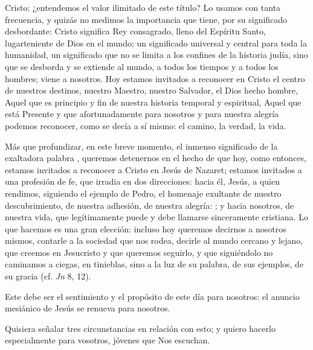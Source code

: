 \begin{body}
Cristo: ¿entendemos el valor ilimitado de este título? Lo usamos con tanta frecuencia, y quizás no medimos la importancia que tiene, por su significado desbordante: Cristo significa Rey consagrado, lleno del Espíritu Santo, lugarteniente de Dios en el mundo; un significado universal y central para toda la humanidad, un significado que no se limita a los confines de la historia judía, sino que se desborda y se extiende al mundo, a todos los tiempos y a todos los hombres; viene a nosotros. Hoy estamos invitados a reconocer en Cristo el centro de nuestros destinos, nuestro Maestro, nuestro Salvador, el Dios hecho hombre, Aquel que es principio y fin de nuestra historia temporal y espiritual, Aquel que está Presente y que afortunadamente para nosotros y para nuestra alegría podemos reconocer, como se decía a sí mismo: el camino, la verdad, la vida.


Más que profundizar, en este breve momento, el inmenso significado de la exaltadora palabra , queremos detenernos en el hecho de que hoy, como entonces, estamos invitados a reconocer a Cristo en Jesús de Nazaret; estamos invitados a una profesión de fe, que irradia en dos direcciones: hacia él, Jesús, a quien rendimos, siguiendo el ejemplo de Pedro, el homenaje exultante de nuestro descubrimiento, de nuestra adhesión, de nuestra alegría: ; y hacia nosotros, de nuestra vida, que legítimamente puede y debe llamarse sinceramente cristiana. Lo que hacemos es una gran elección: incluso hoy queremos decirnos a nosotros mismos, contarle a la sociedad que nos rodea, decirle al mundo cercano y lejano, que creemos en Jesucristo y que queremos seguirlo, y que siguiéndolo no caminamos a ciegas, en tinieblas, sino a la luz de su palabra, de sus ejemplos, de su gracia (cf. \textit{Jn} 8, 12).

Este debe ser el sentimiento y el propósito de este día para nosotros: el anuncio mesiánico de Jesús se renueva para nosotros.

Quisiera señalar tres circunstancias en relación con esto; y quiero hacerlo especialmente para vosotros, jóvenes que Nos escuchan.



\end{body}
